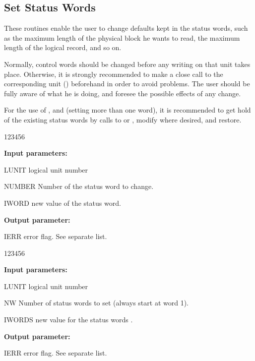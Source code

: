 \subsection{Set Status Words}
 
These routines enable the user to change defaults kept in the  status
words, such as the maximum length of the physical block he wants to
read, the maximum length of the logical record, and so on.
 
Normally, control words should be changed before any writing on  that
unit takes place. Otherwise, it is strongly recommended to make a
close call to the corresponding unit () beforehand in order to
avoid problems. The user should be fully aware of what he is doing,
and foresee the possible effects of any change.
 
For the use of , and  
(setting more than one word), it is
recommended to get hold of the existing status words by calls to
 or , modify where desired, and restore.


\begin{DLtt}{123456}
\item[{\rm\bf Input parameters:}]
\item[LUNIT] logical unit number
\item[NUMBER] Number of the status word to change.
\item[IWORD] new value of the status word.
\item[{\rm\bf Output parameter:}]
\item[IERR] error flag. See separate list.
\end{DLtt}


\begin{DLtt}{123456}
\item[{\rm\bf Input parameters:}]
\item[LUNIT] logical unit number
\item[NW] Number of status words to set (always start at word 1).
\item[IWORDS] new value for the status words .
\item[{\rm\bf Output parameter:}]
\item[IERR] error flag. See separate list.
\end{DLtt}


